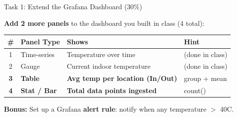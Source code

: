 \documentclass[aspectratio=169,11pt]{beamer}
\begin{document}
\begin{frame}[fragile]{Task 1: Extend the Grafana Dashboard (30\%)}

    \vspace{0.2cm}
    \textbf{Add 2 more panels} to the dashboard you built in class (4 total):

    \vspace{0.2cm}
    \begin{tabular}{clll}
        \toprule
        \textbf{\#} & \textbf{Panel Type} & \textbf{Shows} & \textbf{Hint} \\
        \midrule
        1 & Time-series & Temperature over time & (done in class) \\
        2 & Gauge & Current indoor temperature & (done in class) \\
        \textbf{3} & \textbf{Table} & \textbf{Avg temp per location (In/Out)} & group + mean \\
        \textbf{4} & \textbf{Stat / Bar} & \textbf{Total data points ingested} & count() \\
        \bottomrule
    \end{tabular}

    \vspace{0.2cm}
    \textbf{Bonus:} Set up a Grafana \textbf{alert rule}: notify when any temperature $>$ 40\textdegree C.

    \vspace{0.1cm}
\end{frame}
\end{document}
